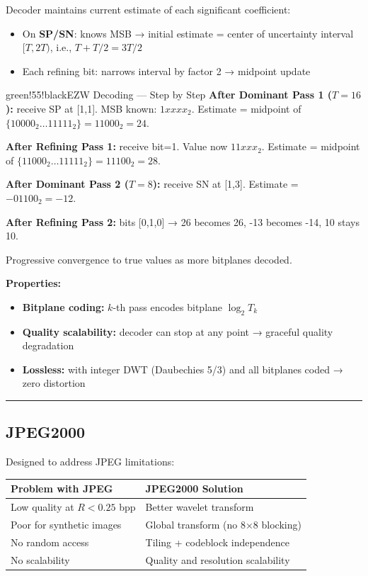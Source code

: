 Decoder maintains current estimate of each significant coefficient:
\begin{itemize}
\item On \textbf{SP/SN}: knows MSB → initial estimate = center of uncertainty interval $[T, 2T)$, i.e., $T + T/2 = 3T/2$
\item Each refining bit: narrows interval by factor 2 → midpoint update
\end{itemize}

\begin{calloutbox}{green!55!black}{EZW Decoding — Step by Step}
\textbf{After Dominant Pass 1 ($T=16$):} receive SP at [1,1]. MSB known: $1xxxx_2$. Estimate = midpoint of $\{10000_2 \ldots 11111_2\} = 11000_2 = 24$.

\textbf{After Refining Pass 1:} receive bit=1. Value now $11xxx_2$. Estimate = midpoint of $\{11000_2 \ldots 11111_2\} = 11100_2 = 28$.

\textbf{After Dominant Pass 2 ($T=8$):} receive SN at [1,3]. Estimate = $-01100_2 = -12$.

\textbf{After Refining Pass 2:} bits [0,1,0] → 26 becomes 26, -13 becomes -14, 10 stays 10.

Progressive convergence to true values as more bitplanes decoded.
\end{calloutbox}

\textbf{Properties:}
\begin{itemize}
\item \textbf{Bitplane coding:} $k$-th pass encodes bitplane $\log_2 T_k$
\item \textbf{Quality scalability:} decoder can stop at any point → graceful quality degradation
\item \textbf{Lossless:} with integer DWT (Daubechies 5/3) and all bitplanes coded → zero distortion
\end{itemize}

\bigskip\hrule\bigskip

\subsection{JPEG2000}

Designed to address JPEG limitations:

\begin{center}
\begin{tabular}{|l|l|}
\hline
\textbf{Problem with JPEG} & \textbf{JPEG2000 Solution} \\ \hline
Low quality at $R < 0.25$ bpp & Better wavelet transform \\ \hline
Poor for synthetic images & Global transform (no 8×8 blocking) \\ \hline
No random access & Tiling + codeblock independence \\ \hline
No scalability & Quality and resolution scalability \\ \hline
\end{tabular}
\end{center}

